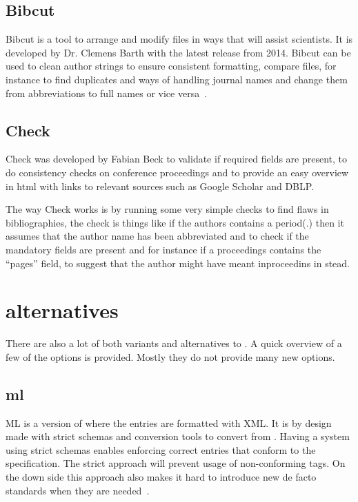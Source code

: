 \subsection{Bibcut}
Bibcut is a tool to arrange and modify {\bibtex} files in ways that
will assist scientists.  It is developed by Dr. Clemens Barth with the
latest release from 2014.  Bibcut can be used to clean author strings
to ensure consistent formatting, compare {\bibtex} files, for instance
to find duplicates and ways of handling journal names and change them
from abbreviations to full names or vice versa~\cite{bibcut_site}.


\subsection{{\bibtex} Check}
{\bibtex} Check was developed by Fabian Beck to validate if required
fields are present, to do consistency checks on conference proceedings
and to provide an easy overview in html with links to relevant sources
such as Google Scholar and DBLP.

The way {\bibtex} Check works is by running some very simple checks to
find flaws in bibliographies, the check is things like if the authors
contains a period(.) then it assumes that the author name has been
abbreviated and to check if the mandatory fields are present and for
instance if a proceedings contains the ``pages'' field, to suggest
that the author might have meant inproceedins in stead.


\section{{\bibtex} alternatives}
\label{sec:bibtex_alternatives}
There are also a lot of both variants and alternatives to {\bibtex}.
A quick overview of a few of the options is provided.  Mostly they do
not provide many new options.

\subsection{{\bibtex}ml} {\bibtex}ML is a version of {\bibtex} where
the entries are formatted with XML.  It is by design made with strict
schemas and conversion tools to convert from {\bibtex}.  Having a
system using strict schemas enables enforcing correct entries that
conform to the specification.  The strict approach will prevent usage
of non-conforming tags.  On the down side this approach also makes it
hard to introduce new de facto standards when they are
needed~\cite{gunhen2007_bibtexml}.

